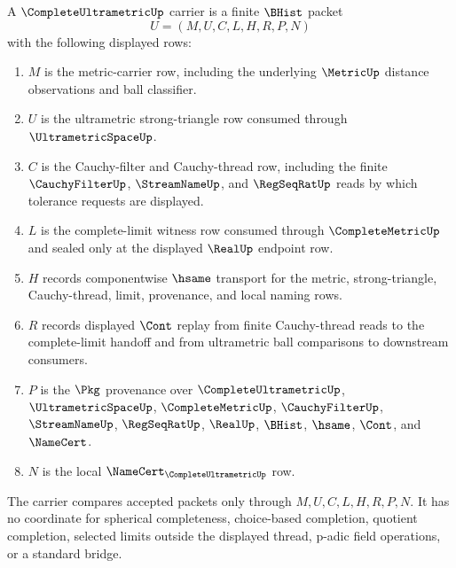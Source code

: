 \begin{definition}
\label{def:complete-ultrametric-carrier}
A $\CompleteUltrametricUp$ carrier is a finite $\BHist$ packet
$$
U=(M,U,C,L,H,R,P,N)
$$
with the following displayed rows:
\begin{enumerate}
\item $M$ is the metric-carrier row, including the underlying $\MetricUp$ distance observations and ball classifier.
\item $U$ is the ultrametric strong-triangle row consumed through $\UltrametricSpaceUp$.
\item $C$ is the Cauchy-filter and Cauchy-thread row, including the finite $\CauchyFilterUp$, $\StreamNameUp$, and $\RegSeqRatUp$ reads by which tolerance requests are displayed.
\item $L$ is the complete-limit witness row consumed through $\CompleteMetricUp$ and sealed only at the displayed $\RealUp$ endpoint row.
\item $H$ records componentwise $\hsame$ transport for the metric, strong-triangle, Cauchy-thread, limit, provenance, and local naming rows.
\item $R$ records displayed $\Cont$ replay from finite Cauchy-thread reads to the complete-limit handoff and from ultrametric ball comparisons to downstream consumers.
\item $P$ is the $\Pkg$ provenance over $\CompleteUltrametricUp$, $\UltrametricSpaceUp$, $\CompleteMetricUp$, $\CauchyFilterUp$, $\StreamNameUp$, $\RegSeqRatUp$, $\RealUp$, $\BHist$, $\hsame$, $\Cont$, and $\NameCert$.
\item $N$ is the local $\NameCert_{\CompleteUltrametricUp}$ row.
\end{enumerate}
The carrier compares accepted packets only through $M,U,C,L,H,R,P,N$. It has no coordinate for spherical completeness, choice-based completion, quotient completion, selected limits outside the displayed thread, p-adic field operations, or a standard bridge.
\end{definition}

